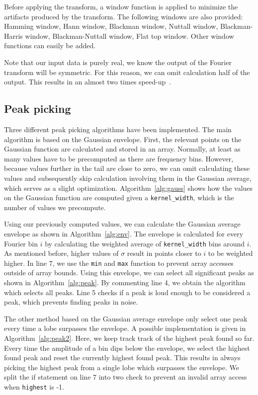 \documentclass[10pt,twocolumn]{article}
\begin{document}
Before applying the transform, a window function is applied to minimize the artifacts produced by the transform. The following windows are also provided: Hamming window, Hann window, Blackman window, Nuttall window, Blackman-Harris window, Blackman-Nuttall window, Flat top window. Other window functions can easily be added.

Note that our input data is purely real, we know the output of the Fourier transform will be symmetric. For this reason, we can omit calculation half of the output. This results in an almost two times speed-up~\cite{twotimes}.

\subsection{Peak picking} \label{sub:peak}
Three different peak picking algorithms have been implemented. The main algorithm is based on the Gaussian envelope. First, the relevant points on the Gaussian function are calculated and stored in an array. Normally, at least as many values have to be precomputed as there are frequency bins. However, because values further in the tail are close to zero, we can omit calculating these values and subsequently skip calculation involving them in the Gaussian average, which serves as a slight optimization. Algorithm~\ref{alg:gauss} shows how the values on the Gaussian function are computed given a \texttt{kernel\_width}, which is the number of values we precompute.


Using our previously computed values, we can calculate the Gaussian average envelope as shown in Algorithm~\ref{alg:env}. The envelope is calculated for every Fourier bin $i$ by calculating the weighted average of \texttt{kernel\_width} bins around $i$. As mentioned before, higher values of $\sigma$ result in points closer to $i$ to be weighted higher. In line 7, we use the \texttt{min} and \texttt{max} function to prevent array accesses outside of array bounds. Using this envelope, we can select all significant peaks as shown in Algorithm~\ref{alg:peak}. By commenting line 4, we obtain the algorithm which selects all peaks. Line 5 checks if a peak is loud enough to be considered a peak, which prevents finding peaks in noise.

The other method based on the Gaussian average envelope only select one peak every time a lobe surpasses the envelope. A possible implementation is given in Algorithm~\ref{alg:peak2}. Here, we keep track track of the highest peak found so far. Every time the amplitude of a bin dips below the envelope, we select the highest found peak and reset the currently highest found peak. This results in always picking the highest peak from a single lobe which surpasses the envelope. We split the if statement on line 7 into two check to prevent an invalid array access when \texttt{highest} is -1.



\end{document}
